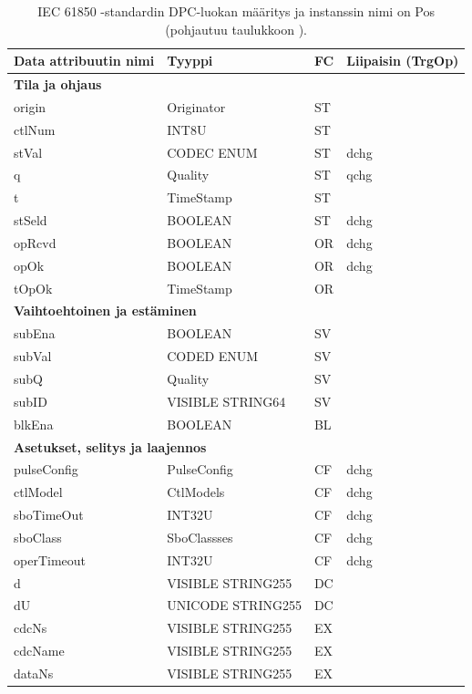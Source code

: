 \begin{table}[ht!]
	\caption{IEC 61850 -standardin DPC-luokan määritys ja instanssin nimi on Pos (pohjautuu taulukkoon \mbox{\cite[s.~44]{IEC61850-7-3}}).}
	\label{tab:iec61850-DPC-class-definition}
	\begin{tabular}{l | l | l | l}
		\hline
		\textbf{Data attribuutin nimi} & \textbf{Tyyppi} & \textbf{FC} & \textbf{Liipaisin (TrgOp)} \\
		\hline
		\multicolumn{4}{l}{\textbf{Tila ja ohjaus}} \\
		\hline
		origin & Originator & ST &  \\
		ctlNum & INT8U & ST &  \\
		stVal & CODEC ENUM & ST & dchg \\
		q & Quality & ST & qchg \\
		t & TimeStamp & ST &  \\
		stSeld & BOOLEAN & ST & dchg \\
		opRcvd & BOOLEAN & OR & dchg \\
		opOk & BOOLEAN & OR & dchg \\
		tOpOk & TimeStamp & OR &  \\
		\hline
		\multicolumn{4}{l}{\textbf{Vaihtoehtoinen ja estäminen}} \\
		\hline
		subEna & BOOLEAN & SV &  \\
		subVal & CODED ENUM & SV &  \\
		subQ & Quality & SV &  \\
		subID & VISIBLE STRING64 & SV &  \\
		blkEna & BOOLEAN & BL &  \\
		\hline
		\multicolumn{4}{l}{\textbf{Asetukset, selitys ja laajennos}} \\
		\hline
		pulseConfig & PulseConfig & CF & dchg \\
		ctlModel & CtlModels & CF & dchg \\
		sboTimeOut & INT32U & CF & dchg \\
		sboClass & SboClassses & CF & dchg \\
		operTimeout & INT32U & CF & dchg \\
		d & VISIBLE STRING255 & DC &  \\
		dU & UNICODE STRING255 & DC &  \\
		cdcNs & VISIBLE STRING255 & EX &  \\
		cdcName & VISIBLE STRING255 & EX &  \\
		dataNs & VISIBLE STRING255 & EX &  \\
		\hline
	\end{tabular}
\end{table}

